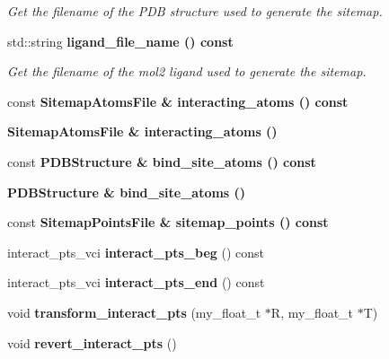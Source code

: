 \begin{CompactItemize}
\begin{CompactList}\small\item\em Get the filename of the PDB structure used to generate the sitemap. \item\end{CompactList}\item 
std::string \bf{ligand\_\-file\_\-name} () const \label{classSimSite3D_1_1Sitemap_cb41876f6caf930dbfd134532ba02a0c}

\begin{CompactList}\small\item\em Get the filename of the mol2 ligand used to generate the sitemap. \item\end{CompactList}\item 
const \bf{Sitemap\-Atoms\-File} \& \textbf{interacting\_\-atoms} () const \label{classSimSite3D_1_1Sitemap_8cef15e389674f18b95f808397f30163}

\item 
\bf{Sitemap\-Atoms\-File} \& \textbf{interacting\_\-atoms} ()\label{classSimSite3D_1_1Sitemap_49015f2e7b31c7f19a0a47abc9af3db2}

\item 
const \bf{PDBStructure} \& \textbf{bind\_\-site\_\-atoms} () const \label{classSimSite3D_1_1Sitemap_e56f41b7103116460be52ca6be7f2549}

\item 
\bf{PDBStructure} \& \textbf{bind\_\-site\_\-atoms} ()\label{classSimSite3D_1_1Sitemap_7c01c7079e267cf260d1c7e255ae6b6f}

\item 
const \bf{Sitemap\-Points\-File} \& \textbf{sitemap\_\-points} () const \label{classSimSite3D_1_1Sitemap_5bdd019adc94558d333e1b988a574b32}

\item 
interact\_\-pts\_\-vci \textbf{interact\_\-pts\_\-beg} () const \label{classSimSite3D_1_1Sitemap_a7ad7e74e6ef0cdfb3e8e487e2db6200}

\item 
interact\_\-pts\_\-vci \textbf{interact\_\-pts\_\-end} () const \label{classSimSite3D_1_1Sitemap_fe90bda50b24ac3ecfa92df9d698b7d1}

\item 
void \textbf{transform\_\-interact\_\-pts} (my\_\-float\_\-t $\ast$R, my\_\-float\_\-t $\ast$T)\label{classSimSite3D_1_1Sitemap_dbd2a6cb931e9a427fa8543216600632}

\item 
void \textbf{revert\_\-interact\_\-pts} ()\label{classSimSite3D_1_1Sitemap_ec8a4a45362b46f0fd2f25db0876f488}


\end{CompactItemize}
